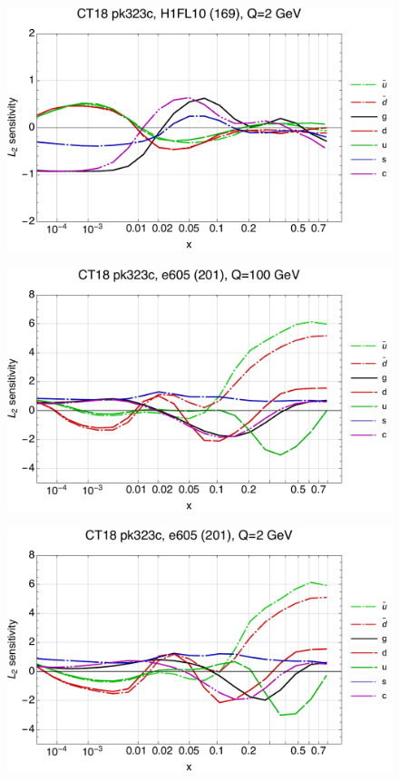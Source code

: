 \documentclass[10pt,aps,prd,floatfix,titlepage]{revtex4}
\begin{document}
\begin{figure}
\includegraphics[width=\textwidth,height=0.44\textheight,keepaspectratio]{1/169_ct18nn_L2_q2_Sf_1.pdf}
\caption{}
\end{figure}
\clearpage
\begin{figure}
\includegraphics[width=\textwidth,height=0.44\textheight,keepaspectratio]{1/201_ct18nn_L2_q100_Sf_1.pdf}
\caption{}
\end{figure}
\begin{figure}
\includegraphics[width=\textwidth,height=0.44\textheight,keepaspectratio]{1/201_ct18nn_L2_q2_Sf_1.pdf}
\caption{}
\end{figure}
\end{document}
